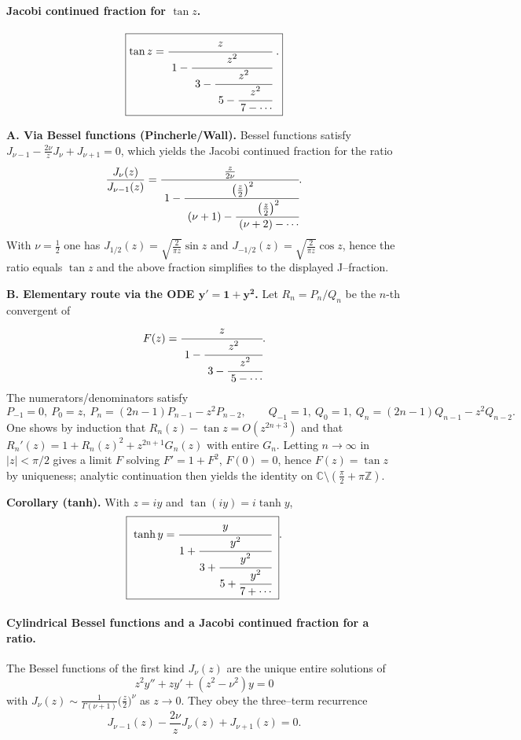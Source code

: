 \documentclass[11pt,a4paper]{article}
\theoremstyle{definition}
\theoremstyle{definition}
\theoremstyle{plain}
\theoremstyle{remark}
\begin{document}

\paragraph{Jacobi continued fraction for $\tan z$.}
\[
\boxed{\displaystyle 
	\tan z=\cfrac{z}{\;1-\cfrac{z^{2}}{\;3-\cfrac{z^{2}}{\;5-\cfrac{z^{2}}{\,7-\cdots}}}}\ .}
\]

\textbf{A. Via Bessel functions (Pincherle/Wall).}
Bessel functions satisfy $J_{\nu-1}-\frac{2\nu}{z}J_\nu+J_{\nu+1}=0$, which yields the Jacobi
continued fraction for the ratio
\[
\frac{J_\nu(z)}{J_{\nu-1}(z)}
=\cfrac{\tfrac{z}{2\nu}}{\;1-\cfrac{\left(\tfrac{z}{2}\right)^{2}}{\;(\nu+1)-\cfrac{\left(\tfrac{z}{2}\right)^{2}}{\;(\nu+2)-\cdots}}}.
\]
With $\nu=\tfrac12$ one has $J_{1/2}(z)=\sqrt{\tfrac{2}{\pi z}}\sin z$ and
$J_{-1/2}(z)=\sqrt{\tfrac{2}{\pi z}}\cos z$, hence the ratio equals $\tan z$ and the above
fraction simplifies to the displayed J–fraction.

\medskip
\textbf{B. Elementary route via the ODE $\boldsymbol{y'=1+y^2}$.}
Let $R_n=P_n/Q_n$ be the $n$-th convergent of
\[
F(z)=\cfrac{z}{\;1-\cfrac{z^{2}}{\;3-\cfrac{z^{2}}{\;5-\cdots}}}.
\]
The numerators/denominators satisfy
\[
P_{-1}=0,\ P_0=z,\ P_n=(2n-1)P_{n-1}-z^2P_{n-2},\qquad
Q_{-1}=1,\ Q_0=1,\ Q_n=(2n-1)Q_{n-1}-z^2Q_{n-2}.
\]
One shows by induction that $R_n(z)-\tan z=O(z^{2n+3})$ and that
$R_n'(z)=1+R_n(z)^2+z^{2n+1}G_n(z)$ with entire $G_n$.
Letting $n\to\infty$ in $|z|<\pi/2$ gives a limit $F$ solving $F'=1+F^2$, $F(0)=0$,
hence $F(z)=\tan z$ by uniqueness; analytic continuation then yields the identity
on $\mathbb C\!\setminus\!(\tfrac{\pi}{2}+\pi\mathbb Z)$.

\medskip
\textbf{Corollary (tanh).}
With $z=iy$ and $\tan(iy)=i\tanh y$,
\[
\boxed{\ \tanh y=\cfrac{y}{\displaystyle 1+\cfrac{y^2}{\displaystyle 3+\cfrac{y^2}{\displaystyle 5+\cfrac{y^2}{7+\cdots}}}}\ }.
\]


\paragraph{Cylindrical Bessel functions and a Jacobi continued fraction for a ratio.}
The Bessel functions of the first kind $J_\nu(z)$ are the unique entire solutions of
\[
z^2 y''+z y'+(z^2-\nu^2)y=0
\]
with $J_\nu(z)\sim \frac1{\Gamma(\nu+1)}\bigl(\frac z2\bigr)^\nu$ as $z\to0$.
They obey the three–term recurrence
\begin{equation}\label{eq:3term}
	J_{\nu-1}(z)-\frac{2\nu}{z}J_\nu(z)+J_{\nu+1}(z)=0.
\end{equation}
\end{document}
